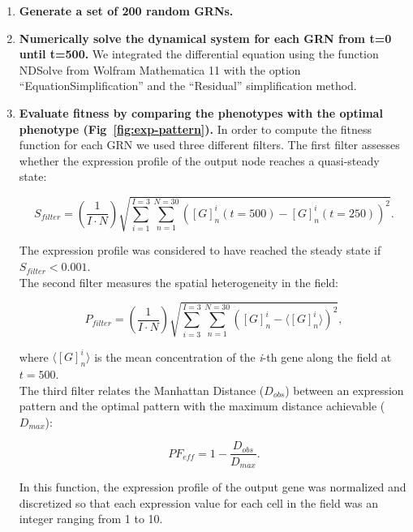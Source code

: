 \documentclass[10pt,letterpaper]{article}
\begin{document}
\begin{enumerate}
 \item{\bf Generate a set of 200 random GRNs.}
 
 \item{\bf Numerically solve the dynamical system for each GRN from t=0 until 
 t=500.} We integrated the differential equation using the function NDSolve from
 Wolfram Mathematica 11 with the option “EquationSimplification” and the 
 “Residual” simplification method.
 
 \item{\bf Evaluate fitness by comparing the phenotypes with the optimal 
 phenotype (Fig~\ref{fig:exp-pattern}).} In order to compute the fitness 
 function for each GRN we used three different filters. The first filter 
 assesses whether the expression profile of the output node reaches a 
 quasi-steady state:
 
 \begin{equation}
  S_{filter} = \left( \frac{1}{I \cdot N}\right) \sqrt{\sum_{i=1}^{I=3}
  \sum_{n=1}^{N=30} ([G]_n^i(t=500) - [G]^i_n(t=250))^2}.
 \end{equation}
 
 The expression profile was considered to have reached the steady state if 
 $S_{filter} < 0.001$.\\
 
 The second filter measures the spatial heterogeneity in the field:
 
 \begin{equation}
  P_{filter} = \left( \frac{1}{I \cdot N} \right) \sqrt{ \sum_{i=3}^{I=3}
  \sum_{n=1}^{N=30} \left( [G]^i_n - \langle [G]^i_n \rangle \right)^2 },
 \end{equation}
 
 where $\langle [G]^i_n \rangle$ is the mean concentration of the \emph{i}-th 
 gene along the field at $t=500$.\\
 
 The third filter relates the Manhattan Distance ($D_{obs}$) between an
 expression pattern and the optimal pattern with the maximum distance achievable
 ($D_{max}$):
 
 \begin{equation}
  \mathit{PF}_{eff} = 1 - \frac{D_{obs}}{D_{max}}.
 \end{equation}
 
 In this function, the expression profile of the output gene was normalized and
 discretized so that each expression value for each cell in the field was an
 integer ranging from 1 to 10.\\
 

\end{enumerate}
\end{document}
